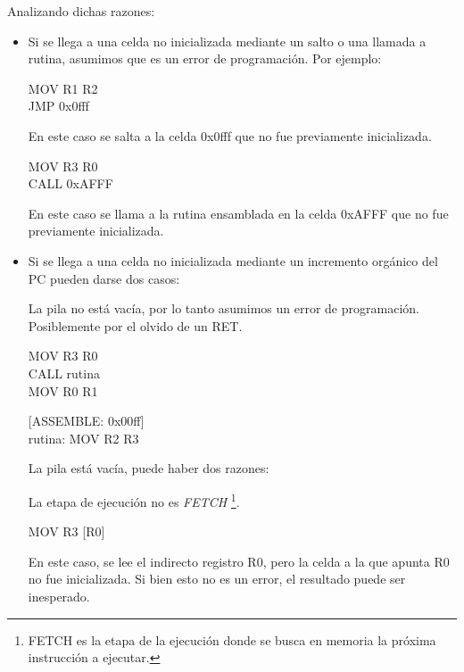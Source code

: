 Analizando dichas razones: 
\begin{itemize}
  \item Si se llega a una celda no inicializada mediante un salto o una llamada a rutina, asumimos que es un error de programación. Por ejemplo:
  \begin{center}
    MOV R1 R2 \\
    JMP 0x0fff \\
    \begin{footnotesize}
      En este caso se salta a la celda 0x0fff que no fue previamente inicializada.
    \end{footnotesize}
  \end{center}

  \begin{center}
    MOV R3 R0 \\
    CALL 0xAFFF \\
    \begin{footnotesize}
      En este caso se llama a la rutina ensamblada en la celda 0xAFFF que no fue previamente inicializada.
    \end{footnotesize}
  \end{center}

  \item Si se llega a una celda no inicializada mediante un incremento orgánico del PC pueden darse dos casos:
  
  La pila no está vacía, por lo tanto asumimos un error de programación. Posiblemente por el olvido de un RET.
  \begin{center}
    MOV R3 R0 \\
    CALL rutina \\
    MOV R0 R1 \\
  \end{center}
  \begin{center}
    [ASSEMBLE: 0x00ff] \\
    rutina: MOV R2 R3
  \end{center}
  
  La pila está vacía, puede haber dos razones:

  La etapa de ejecución no es \textit{FETCH} \footnote{FETCH es la etapa de la ejecución donde se busca en memoria la próxima instrucción a ejecutar.}. 
  \begin{center}
    MOV R3 [R0] \\
    \begin{footnotesize}
      En este caso, se lee el indirecto registro R0, pero la celda a la que apunta R0 no fue inicializada. Si bien esto no es un error, el resultado puede ser inesperado.
    \end{footnotesize}
  \end{center}
    

\end{itemize}
